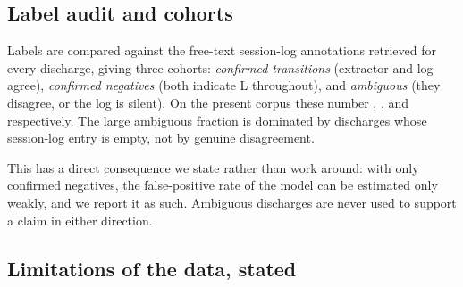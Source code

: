 \subsection{Label audit and cohorts}
\label{app:data-audit}

Labels are compared against the free-text session-log annotations retrieved
for every discharge, giving three cohorts: \emph{confirmed transitions}
(extractor and log agree), \emph{confirmed negatives} (both indicate L
throughout), and \emph{ambiguous} (they disagree, or the log is silent).
On the present corpus these number \nTrans{}, \nNoTrans{}, and \nAmbig{}
respectively. The large ambiguous fraction is dominated by discharges whose
session-log entry is empty, not by genuine disagreement.

This has a direct consequence we state rather than work around: with only
\nNoTrans{} confirmed negatives, the false-positive rate of the model can be
estimated only weakly, and we report it as such. Ambiguous discharges are
never used to support a claim in either direction.

\subsection{Limitations of the data, stated}
\label{app:data-limits}

